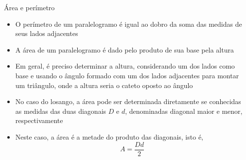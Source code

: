 \begin{frame}[fragile]{Área e perímetro}

    \begin{itemize}
        \item O perímetro de um paralelogramo é igual ao dobro da soma das medidas de 
            seus lados adjacentes

        \item A área de um paralelogramo é dado pelo produto de sua base pela altura

        \item Em geral, é preciso determinar a altura, considerando um dos lados como base e 
            usando o ângulo formado com um dos lados adjacentes para montar um triângulo, onde a
            altura seria o cateto oposto ao ângulo

        \item No caso do losango, a área pode ser determinada diretamente se conhecidas as
            medidas das duas diagonais $D$ e $d$, denominadas diagonal maior e menor, 
            respectivamente

        \item Neste caso, a área é a metade do produto das diagonais, isto é,
        \[
            A = \frac{Dd}{2}
        \]

    \end{itemize}

\end{frame}
